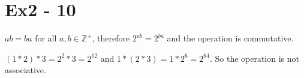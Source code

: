 \section*{Ex2 - 10}
$ ab = ba $ for all $ a, b \in \mathbb{Z}^+ $, therefore $ 2^{ab} = 2^{ba} $ and the operation is commutative.

$ (1 * 2) * 3  = 2^2 * 3 = 2^{12} $ and $ 1 * (2 * 3) = 1 * 2^6 = 2^{64} $. So the operation is not associative.